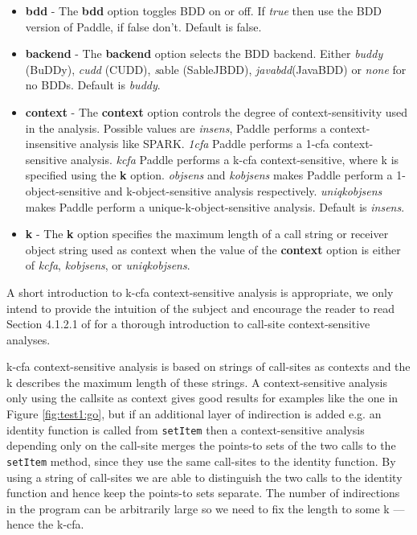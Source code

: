 \documentclass{article}
\newcommand{\code}[1]{\texttt{\small #1}}
\begin{document}
\begin{itemize}
\item[] {\bf bdd} - The {\bf bdd} option toggles BDD on or off. If
\emph{true} then use the BDD version of Paddle, if false
don't. Default is false.
\item[] {\bf backend} - The {\bf backend} option selects the BDD
backend. Either \emph{buddy} (BuDDy), \emph{cudd} (CUDD), {\emph
sable} (SableJBDD), \emph{javabdd}(JavaBDD) or \emph{none} for no
BDDs.  Default is \emph{buddy}.
\item[] {\bf context} - The {\bf context} option controls the degree
of context-sensitivity used in the analysis. Possible values are
\emph{insens}, Paddle performs a context-insensitive analysis like
SPARK. \emph{1cfa} Paddle performs a 1-cfa context-sensitive
analysis. \emph{kcfa} Paddle performs a k-cfa context-sensitive, where
k is specified using the {\bf k} option. \emph{objsens} and
\emph{kobjsens} makes Paddle perform a 1-object-sensitive and
k-object-sensitive analysis respectively. \emph{uniqkobjsens} makes
Paddle perform a unique-k-object-sensitive analysis. Default is
\emph{insens}.

\item[] {\bf k} - The {\bf k} option specifies the maximum length of a
call string or receiver object string used as context when the value
of the {\bf context} option is either of \emph{kcfa}, \emph{kobjsens},
or \emph{uniqkobjsens}.
\end{itemize}

A short introduction to k-cfa context-sensitive analysis is
appropriate, we only intend to provide the intuition of the subject
and encourage the reader to read Section 4.1.2.1 of \cite{lhotak-phd}
for a thorough introduction to call-site context-sensitive analyses.

k-cfa context-sensitive analysis is based on strings of call-sites as
contexts and the k describes the maximum length of these strings. A
context-sensitive analysis only using the callsite as context gives
good results for examples like the one in Figure \ref{fig:test1:go},
but if an additional layer of indirection is added e.g. an identity
function is called from \code{setItem} then a context-sensitive
analysis depending only on the call-site merges the points-to sets of
the two calls to the \code{setItem} method, since they use the same
call-sites to the identity function. By using a string of call-sites we
are able to distinguish the two calls to the identity function and
hence keep the points-to sets separate. The number of indirections in
the program can be arbitrarily large so we need to fix the length to
some k --- hence the k-cfa.\\
\end{document}
